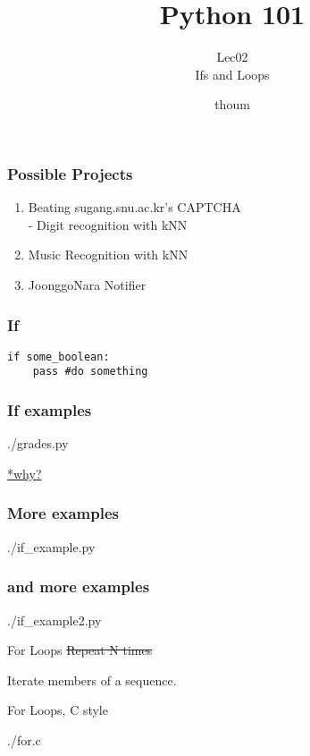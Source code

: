 \documentclass{beamer}
\title{Python 101}
\subtitle{Lec02 \\ Ifs and Loops}
\author{thoum}
\begin{document}
\frame{\titlepage}

\begin{frame}[fragile]
\frametitle{Possible Projects}
  \begin{enumerate}
    \item Beating sugang.snu.ac.kr's CAPTCHA\\
      - Digit recognition with kNN
    \item Music Recognition with kNN
    \item JoonggoNara Notifier
  \end{enumerate}
\end{frame}

\begin{frame}[fragile]
\frametitle{If}
\begin{lstlisting}
if some_boolean:
    pass #do something
\end{lstlisting}
\end{frame}

\begin{frame}
\frametitle{If examples}
  \begin{lstinputlisting}
    {./grades.py}
  \end{lstinputlisting}
  \href{https://stackoverflow.com/questions/48375753/why-are-chained-operator-expressions-slower-than-their-expanded-equivalent}{*why?}
\end{frame}

\begin{frame}
\frametitle{More examples}
  \begin{lstinputlisting}
    {./if_example.py}
  \end{lstinputlisting}
\end{frame}

\begin{frame}
\frametitle{and more examples}
  \begin{lstinputlisting}
    {./if_example2.py}
  \end{lstinputlisting}
\end{frame}

\begin{frame}{For Loops}
  \sout{Repeat N times}

  Iterate members of a sequence.
\end{frame}

\begin{frame}{For Loops, C style}
  \begin{lstinputlisting}
    {./for.c}
  \end{lstinputlisting}
\end{frame}
\end{document}
